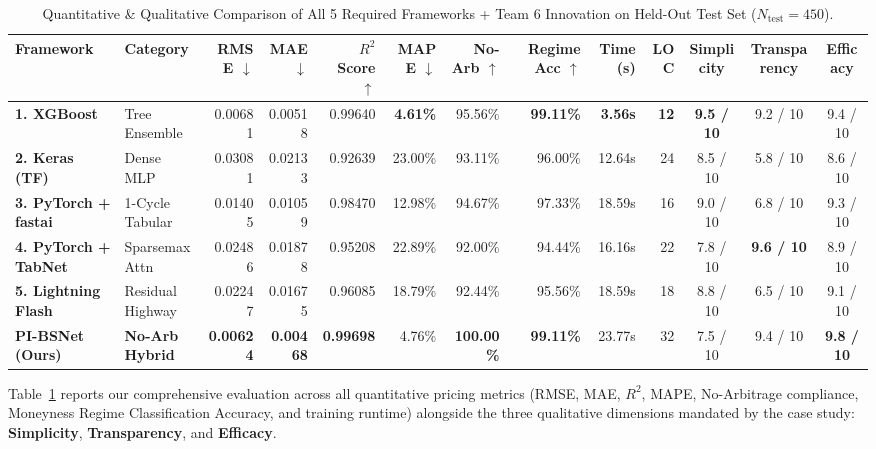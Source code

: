 \documentclass[10pt,twocolumn]{article}
\begin{document}
\begin{table}[t]
\centering
\caption{Quantitative \& Qualitative Comparison of All 5 Required Frameworks + Team 6 Innovation on Held-Out Test Set ($N_{\text{test}}=450$).}
\label{tab:main_results}
\footnotesize
\setlength{\tabcolsep}{4.8pt}
\begin{tabular}{@{}llrrrrrrrrccc@{}}
\toprule
\textbf{Framework} & \textbf{Category} & \textbf{RMSE $\downarrow$} & \textbf{MAE $\downarrow$} & \textbf{$R^2$ Score $\uparrow$} & \textbf{MAPE $\downarrow$} & \textbf{No-Arb $\uparrow$} & \textbf{Regime Acc $\uparrow$} & \textbf{Time (s)} & \textbf{LOC} & \textbf{Simplicity} & \textbf{Transparency} & \textbf{Efficacy} \\
\midrule
\textbf{1. XGBoost} & Tree Ensemble & 0.00681 & 0.00518 & 0.99640 & \textbf{4.61\%} & 95.56\% & \textbf{99.11\%} & \textbf{3.56s} & \textbf{12} & \textbf{9.5 / 10} & 9.2 / 10 & 9.4 / 10 \\
\textbf{2. Keras (TF)} & Dense MLP & 0.03081 & 0.02133 & 0.92639 & 23.00\% & 93.11\% & 96.00\% & 12.64s & 24 & 8.5 / 10 & 5.8 / 10 & 8.6 / 10 \\
\textbf{3. PyTorch + fastai} & 1-Cycle Tabular & 0.01405 & 0.01059 & 0.98470 & 12.98\% & 94.67\% & 97.33\% & 18.59s & 16 & 9.0 / 10 & 6.8 / 10 & 9.3 / 10 \\
\textbf{4. PyTorch + TabNet} & Sparsemax Attn & 0.02486 & 0.01878 & 0.95208 & 22.89\% & 92.00\% & 94.44\% & 16.16s & 22 & 7.8 / 10 & \textbf{9.6 / 10} & 8.9 / 10 \\
\textbf{5. Lightning Flash} & Residual Highway & 0.02247 & 0.01675 & 0.96085 & 18.79\% & 92.44\% & 95.56\% & 18.59s & 18 & 8.8 / 10 & 6.5 / 10 & 9.1 / 10 \\
\midrule
\textbf{PI-BSNet (Ours)} & \textbf{No-Arb Hybrid} & \textbf{0.00624} & \textbf{0.00468} & \textbf{0.99698} & 4.76\% & \textbf{100.00\%} & \textbf{99.11\%} & 23.77s & 32 & 7.5 / 10 & 9.4 / 10 & \textbf{9.8 / 10} \\
\bottomrule
\end{tabular}
\end{table}

Table~\ref{tab:main_results} reports our comprehensive evaluation across all quantitative pricing metrics (RMSE, MAE, $R^2$, MAPE, No-Arbitrage compliance, Moneyness Regime Classification Accuracy, and training runtime) alongside the three qualitative dimensions mandated by the case study: \textbf{Simplicity}, \textbf{Transparency}, and \textbf{Efficacy}.
\end{document}
